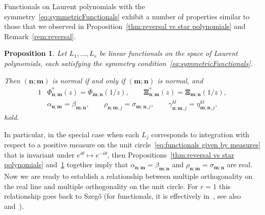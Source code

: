 \documentclass[reqno,centertags,11pt,draft]{amsart}
\newtheorem{prop}[thm]{Proposition}
\begin{document}
Functionals on Laurent polynomials with the symmetry~\eqref{eq:symmetricFunctionals} exhibit a number of properties similar to those that we observed in Proposition~\ref{thm:reversal vs star polynomials} and Remark~\ref{rem:reversal}. 

\begin{prop}\label{rem:Rsymmetry}
    Let $L_1,\ldots,L_r$ be linear functionals on the space of Laurent polynomials, each satisfying the symmetry condition~\eqref{eq:symmetricFunctionals}.
    
    Then $(\bm{n};\bm{m})$ is normal if and only if $(\bm{m};\bm{n})$ is normal, and  
    \begin{alignat}{1}
        & \Phi_{\bm{n};\bm{m}}^*(z)=\Phi_{\bm{m};\bm{n}}(1/z),
        \qquad
        \bm{\Xi}^*_{\bm{n};\bm{m}}(z) = \bm{\Xi}_{\bm{m};\bm{n}}(1/z), 
        \\
        & \label{eq:szego symmetry}
        \alpha_{\bm{n};\bm{m}} = {\beta}_{\bm{m};\bm{n}},
        \qquad
        \rho_{\bm{n};\bm{m},j}= \sigma_{\bm{m};\bm{n},j},
        \qquad
        \gamma^{kl}_{\bm{n};\bm{m},j}= \eta^{kl}_{\bm{m};\bm{n},j},
    \end{alignat}
    hold.
\end{prop}

In particular, in the special case when each $L_j$ corresponds to integration with respect to a positive measure on the unit circle~\eqref{eq:functionals given by measures} that is invariant under $e^{i\theta}\mapsto e^{-i\theta}$, then Propositions~\ref{thm:reversal vs star polynomials} and~\ref{rem:Rsymmetry} together imply that $\alpha_{\bm{n};\bm{m}} = \beta_{\bm{m};\bm{n}}$ and $\rho_{\bm{n};\bm{m}} = \sigma_{\bm{m};\bm{n}}$ are real.
Now we are ready to establish a relationship between multiple orthogonality on the real line and multiple orthogonality on the unit circle. For $r=1$ this relationship goes back to Szeg\H{o} \cite{Szego} (for functionals, it is effectively in~\cite{GeronimusRelations,GeronimusBook}, see also~\cite[Sect. 13]{OPUC2} and~\cite{DerSim18}). %
\end{document}
